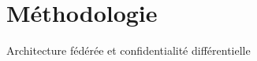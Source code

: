 \section{Méthodologie}

\begin{frame}{Architecture fédérée et confidentialité différentielle}
\end{frame}

